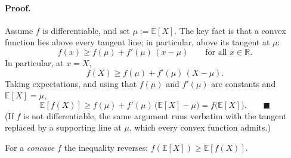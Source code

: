 \begin{nknote}
\paragraph{Proof.}
Assume $f$ is differentiable, and set $\mu := \mathbb{E}[X]$. The key fact is that a convex function lies above every tangent line; in particular, above its tangent at $\mu$:
\[
f(x) \ge f(\mu) + f'(\mu)\,(x - \mu) \qquad \text{for all } x \in \mathbb{R} .
\]
In particular, at $x = X$,
\[
f(X) \ge f(\mu) + f'(\mu)\,(X - \mu) .
\]
Taking expectations, and using that $f(\mu)$ and $f'(\mu)$ are constants and $\mathbb{E}[X] = \mu$,
\[
\mathbb{E}[f(X)] \ge f(\mu) + f'(\mu)\,\big(\mathbb{E}[X] - \mu\big) = f\big(\mathbb{E}[X]\big) . \qquad\blacksquare
\]
(If $f$ is not differentiable, the same argument runs verbatim with the tangent replaced by a supporting line at $\mu$, which every convex function admits.)

For a \emph{concave} $f$ the inequality reverses: $f(\mathbb{E}[X]) \ge \mathbb{E}[f(X)]$.
\end{nknote}
